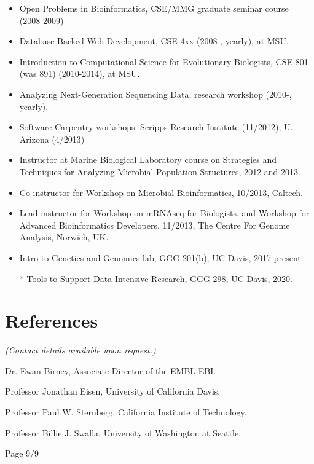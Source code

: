 \documentclass[margin,line]{resume}
\begin{document}
\begin{resume}
\begin{itemize}
\item Open Problems in Bioinformatics, CSE/MMG graduate seminar
  course (2008-2009)
\item Database-Backed Web Development, CSE 4xx (2008-, yearly), at MSU.
\item Introduction to Computational Science for Evolutionary Biologists, CSE 801 (was 891) (2010-2014), at MSU.
\item Analyzing Next-Generation Sequencing Data, research workshop (2010-, yearly).
\item Software Carpentry workshops: Scripps Research Institute (11/2012), U. Arizona (4/2013)
\item Instructor at Marine Biological Laboratory course on Strategies and Techniques for Analyzing Microbial Population Structures, 2012 and 2013.
\item Co-instructor for Workshop on Microbial Bioinformatics, 10/2013, Caltech.
\item Lead instructor for Workshop on mRNAseq for Biologists, and Workshop for Advanced Bioinformatics Developers, 11/2013, The Centre For Genome Analysis, Norwich, UK.
\item Intro to Genetics and Genomics lab, GGG 201(b), UC Davis, 2017-present.
\item[*] Tools to Support Data Intensive Research, GGG 298, UC Davis, 2020.
\end{itemize}

\section{\mysidestyle References}

{\em (Contact details available upon request.)}

Dr. Ewan Birney, Associate Director of the EMBL-EBI.

Professor Jonathan Eisen, University of California Davis.

Professor Paul W. Sternberg, California Institute of Technology.

Professor Billie J. Swalla, University of Washington at Seattle.

{\centerline {Page 9/9}}

\end{resume}
\end{document}
